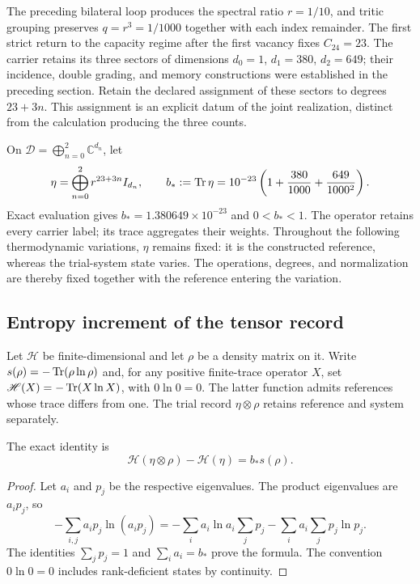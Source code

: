 The preceding bilateral loop produces the spectral ratio $r=1/10$, and
tritic grouping preserves $q=r^3=1/1000$ together with each index remainder.
The first strict return to the capacity regime after the first vacancy
fixes $C_{24}=23$. The carrier retains its three sectors of dimensions
$d_0=1$, $d_1=380$, $d_2=649$; their incidence, double grading, and memory
constructions were established in the preceding section. Retain the
declared assignment of these sectors to degrees $23+3n$. This assignment
is an explicit datum of the joint realization, distinct from the calculation
producing the three counts.

On $\mathcal D=\bigoplus_{n=0}^2\mathbb C^{d_n}$, let
\begin{equation}
 \eta=\bigoplus_{n=0}^2r^{23+3n}I_{d_n},\qquad
 b_*:=\operatorname{Tr}\eta
 =10^{-23}\left(1+\frac{380}{1000}+\frac{649}{1000^2}\right).
 \label{eq:ii-ter27-eta}
\end{equation}
Exact evaluation gives $b_*=1.380649\times10^{-23}$ and $0<b_*<1$.
The operator retains every carrier label; its trace aggregates their weights.
Throughout the following thermodynamic variations, $\eta$ remains fixed:
it is the constructed reference, whereas the trial-system state varies.
The operations, degrees, and normalization are thereby fixed together
with the reference entering the variation.

\subsection{Entropy increment of the tensor record}
\label{subsec:ii-ter27-tensor}

Let $\mathcal H$ be finite-dimensional and let $\rho$ be a density matrix
on it. Write $s(\rho)=-\operatorname{Tr}(\rho\ln\rho)$ and, for any positive
finite-trace operator $X$, set $\mathscr H(X)=-\operatorname{Tr}(X\ln X)$, with
$0\ln0=0$. The latter function admits references whose trace differs
from one. The trial record $\eta\otimes\rho$ retains reference and
system separately.

\begin{theorem}
\label{thm:ii-ter27-tensor}
The exact identity is
\begin{equation}
 \mathscr H(\eta\otimes\rho)-\mathscr H(\eta)=b_*s(\rho).
 \label{eq:ii-ter27-tensor}
\end{equation}
\end{theorem}
\begin{proof}
Let $a_i$ and $p_j$ be the respective eigenvalues. The product eigenvalues
are $a_ip_j$, so
\[
 -\sum_{i,j}a_ip_j\ln(a_ip_j)
 =-\sum_i a_i\ln a_i\sum_jp_j
   -\sum_i a_i\sum_jp_j\ln p_j.
\]
The identities $\sum_jp_j=1$ and $\sum_i a_i=b_*$ prove the formula.
The convention $0\ln0=0$ includes rank-deficient states by continuity.
\end{proof}

